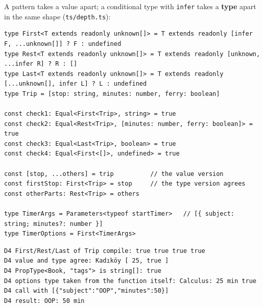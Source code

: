 \documentclass[
  10pt,
]{article}
\begin{document}
A pattern takes a value apart; a conditional type with \texttt{infer}
takes a \textbf{type} apart in the same shape
(\texttt{ts/\allowbreak{}depth.\allowbreak{}ts}):

\begin{verbatim}
type First<T extends readonly unknown[]> = T extends readonly [infer F, ...unknown[]] ? F : undefined
type Rest<T extends readonly unknown[]> = T extends readonly [unknown, ...infer R] ? R : []
type Last<T extends readonly unknown[]> = T extends readonly [...unknown[], infer L] ? L : undefined
type Trip = [stop: string, minutes: number, ferry: boolean]

const check1: Equal<First<Trip>, string> = true
const check2: Equal<Rest<Trip>, [minutes: number, ferry: boolean]> = true
const check3: Equal<Last<Trip>, boolean> = true
const check4: Equal<First<[]>, undefined> = true

const [stop, ...others] = trip          // the value version
const firstStop: First<Trip> = stop     // the type version agrees
const otherParts: Rest<Trip> = others

type TimerArgs = Parameters<typeof startTimer>   // [{ subject: string; minutes?: number }]
type TimerOptions = First<TimerArgs>
\end{verbatim}

\begin{verbatim}
D4 First/Rest/Last of Trip compile: true true true true
D4 value and type agree: Kadıköy [ 25, true ]
D4 PropType<Book, "tags"> is string[]: true
D4 options type taken from the function itself: Calculus: 25 min true
D4 call with [{"subject":"OOP","minutes":50}]
D4 result: OOP: 50 min
\end{verbatim}
\end{document}
